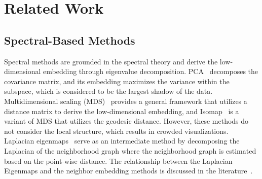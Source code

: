 \section{Related Work}
\label{sec:related_works}
\subsection{Spectral-Based Methods}
\label{subsec:spectral_methods}
Spectral methods are grounded in the spectral theory and derive the low-dimensional embedding through eigenvalue decomposition. PCA~\cite{hotelling1933analysis} decomposes the covariance matrix, and its embedding maximizes the variance within the subspace, which is considered to be the largest shadow of the data. Multidimensional scaling (MDS)~\cite{torgerson1958theory} provides a general framework that utilizes a distance matrix to derive the low-dimensional embedding, and Isomap~\cite{balasubramanian2002isomap} is a variant of MDS that utilizes the geodesic distance. However, these methods do not consider the local structure, which results in crowded visualizations. Laplacian eigenmaps~\cite{belkin2003laplacian} serve as an intermediate method by decomposing the Laplacian of the neighborhood graph where the neighborhood graph is estimated based on the point-wise distance. The relationship between the Laplacian Eigenmaps and the neighbor embedding methods is discussed in the literature~\cite{bohm2022attraction}.

